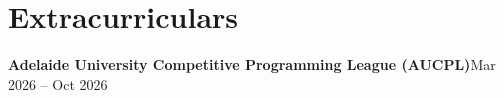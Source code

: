 \documentclass[letterpaper,11pt]{article}
\begin{document}

   \resumeSubHeadingListEnd


\section{Extracurriculars}
   \resumeSubHeadingListStart

   \resumeProjectHeading
         {\textbf{Adelaide University Competitive Programming League (AUCPL)}}{\small Mar 2026 -- Oct 2026}
         \resumeItemListStart
         \resumeItemListEnd
\end{document}
